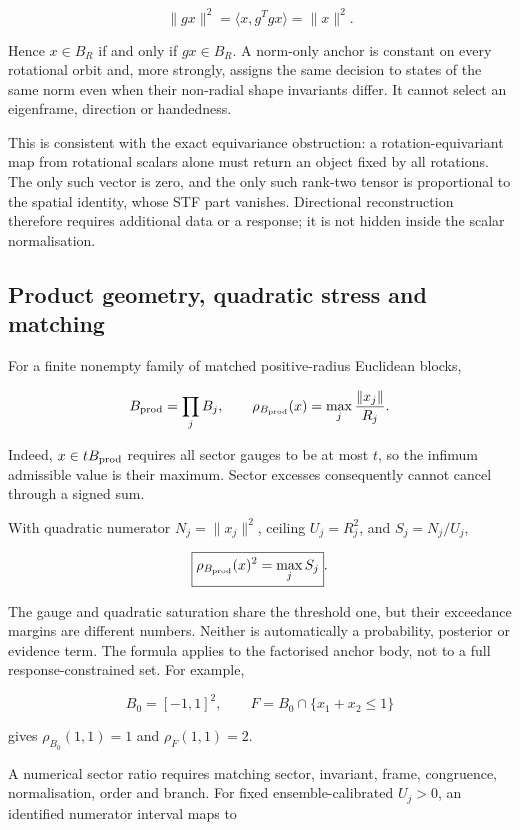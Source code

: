 \documentclass[
  11pt,
  a4paper]{article}
\begin{document}
\[
\|gx\|^2=\langle x,g^Tgx\rangle=\|x\|^2.
\]

Hence \(x\in B_R\) if and only if \(gx\in B_R\). A norm-only anchor is constant on every rotational orbit and, more strongly, assigns the same decision to states of the same norm even when their non-radial shape invariants differ. It cannot select an eigenframe, direction or handedness.

This is consistent with the exact equivariance obstruction: a rotation-equivariant map from rotational scalars alone must return an object fixed by all rotations. The only such vector is zero, and the only such rank-two tensor is proportional to the spatial identity, whose STF part vanishes. Directional reconstruction therefore requires additional data or a response; it is not hidden inside the scalar normalisation.

\hypertarget{product-geometry-quadratic-stress-and-matching}{%
\subsection{Product geometry, quadratic stress and matching}\label{product-geometry-quadratic-stress-and-matching}}

For a finite nonempty family of matched positive-radius Euclidean blocks,

\[
B_{\rm prod}=\prod_jB_j,
\qquad
\rho_{B_{\rm prod}}(x)=\max_j\frac{\|x_j\|}{R_j}.
\]

Indeed, \(x\in tB_{\rm prod}\) requires all sector gauges to be at most \(t\), so the infimum admissible value is their maximum. Sector excesses consequently cannot cancel through a signed sum.

With quadratic numerator \(N_j=\|x_j\|^2\), ceiling \(U_j=R_j^2\), and \(S_j=N_j/U_j\),

\[
\boxed{\rho_{B_{\rm prod}}(x)^2=\max_jS_j}.
\]

The gauge and quadratic saturation share the threshold one, but their exceedance margins are different numbers. Neither is automatically a probability, posterior or evidence term. The formula applies to the factorised anchor body, not to a full response-constrained set. For example,

\[
B_0=[-1,1]^2,\qquad
F=B_0\cap\{x_1+x_2\le1\}
\]

gives \(\rho_{B_0}(1,1)=1\) and \(\rho_F(1,1)=2\).

A numerical sector ratio requires matching sector, invariant, frame, congruence, normalisation, order and branch. For fixed ensemble-calibrated \(U_j>0\), an identified numerator interval maps to
\end{document}
